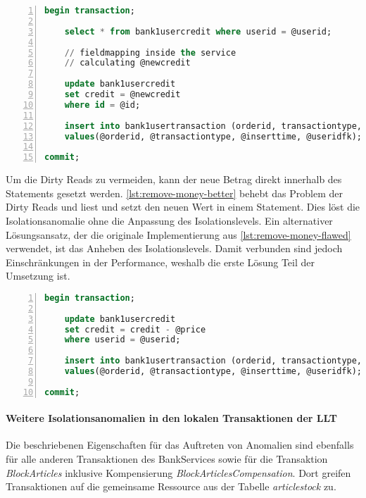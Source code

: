 \begin{lstlisting}[language=SQL, breaklines=true, tabsize=2, showstringspaces=false, frame=single, numbers=left, basicstyle=\small, label={lst:remove-money-flawed}, caption={Fehlerhafte Implementierung der RemoveMoney-Transaktion}, captionpos=b] 
begin transaction;
	
	select * from bank1usercredit where userid = @userid;
	
	// fieldmapping inside the service
	// calculating @newcredit
	
	update bank1usercredit
	set credit = @newcredit
	where id = @id;
	
	insert into bank1usertransaction (orderid, transactiontype, inserttime, useridfk)
	values(@orderid, @transactiontype, @inserttime, @useridfk);
	
commit;
\end{lstlisting}

Um die Dirty Reads zu vermeiden, kann der neue Betrag direkt innerhalb des Statements gesetzt werden. \cref{lst:remove-money-better} behebt das Problem der Dirty Reads und liest und setzt den neuen Wert in einem Statement. Dies löst die Isolationsanomalie ohne die Anpassung des Isolationslevels. Ein alternativer Lösungsansatz, der die originale Implementierung aus \cref{lst:remove-money-flawed} verwendet, ist das Anheben des Isolationslevels. Damit verbunden sind jedoch Einschränkungen in der Performance, weshalb die erste Lösung Teil der Umsetzung ist.

\begin{lstlisting}[language=SQL, breaklines=true, tabsize=2, showstringspaces=false, frame=single, numbers=left, basicstyle=\small, label={lst:remove-money-better}, caption={Implementierung der RemoveMoney-Transaktion ohne Dirty Reads}, captionpos=b] 
begin transaction;
	
	update bank1usercredit
	set credit = credit - @price
	where userid = @userid;
	
	insert into bank1usertransaction (orderid, transactiontype, inserttime, useridfk)
	values(@orderid, @transactiontype, @inserttime, @useridfk);
	
commit;
\end{lstlisting}

\paragraph*{Weitere Isolationsanomalien in den lokalen Transaktionen der LLT}
Die beschriebenen Eigenschaften für das Auftreten von Anomalien sind ebenfalls für alle anderen Transaktionen des BankServices sowie für die Transaktion \textit{BlockArticles} inklusive Kompensierung \textit{BlockArticlesCompensation}. Dort greifen Transaktionen auf die gemeinsame Ressource aus der Tabelle \textit{articlestock} zu. 

